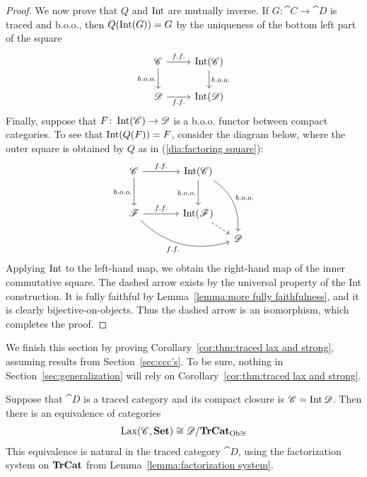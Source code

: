 \documentclass[12pt,oneside,article,draft]{memoir}
\begin{document}
\begin{proof}
We now prove that $Q$ and $\operatorname{Int}$ are mutually inverse. If $G\colon\cat{C}\to\cat{D}$ is traced and b.o.o., then $Q(\operatorname{Int}(G))=G$ by the uniqueness of the bottom left part of the square
$$
\begin{tikzcd}
\cat{C}\arrow[r,"f.f."]\arrow[d,"b.o.o."']&\Int(\cat{C})\arrow[d,"b.o.o."]\\
\cat{D}\arrow[r,"f.f."']&\Int(\cat{D})
\end{tikzcd}
$$
Finally, suppose that $F\colon\operatorname{Int}(\mathscr{C})\to\mathscr{D}$ is a b.o.o. functor between compact categories. To see that $\operatorname{Int}(Q(F))=F$, consider the diagram below, where the outer square is obtained by $Q$ as in (\ref{dia:factoring square}):
$$
\begin{tikzcd}[column sep=small, row sep=small]
\cat{C}\arrow[rr,"f.f."]\arrow[dd,"b.o.o."']&~&\Int(\cat{C})\arrow[dd,"b.o.o."']\arrow[dddr,bend left,"b.o.o."]\\~\\
\cat{F}\arrow[rr,"f.f."]\arrow[drrr,bend right, "f.f."']&&\Int(\cat{F})\arrow[dr,dashed]\\
&&&\cat{D}
\end{tikzcd}
$$
Applying $\operatorname{Int}$ to the left-hand map, we obtain the right-hand map of the inner commutative square. The dashed arrow exists by the universal property of the Int construction. It is fully faithful by Lemma~\ref{lemma:more fully faithfulness}, and it is clearly bijective-on-objects. Thus the dashed arrow is an isomorphism, which completes the proof.


\end{proof}

We finish this section by proving Corollary~\ref{cor:thm:traced lax and strong}, assuming results from Section~\ref{sec:ccc's}. To be sure, nothing in Section~\ref{sec:generalization} will rely on Corollary~\ref{cor:thm:traced lax and strong}.

\begin{corollary}
Suppose that $\cat{D}$ is a traced category and its compact closure is $\mathscr{C}=\operatorname{Int}\mathscr{D}$. Then there is an equivalence of categories
\begin{align}\label{dia:traced lax strong}
\operatorname{Lax}(\mathscr{C},\mathbf{Set})\cong\mathscr{D}/\mathbf{TrCat}_{{\operatorname{Ob}\cong}}
\end{align}
This equivalence is natural in the traced category $\cat{D}$, using the factorization system on $\mathbf{TrCat}$ from Lemma~\ref{lemma:factorization system}.
\end{corollary}
\end{document}
